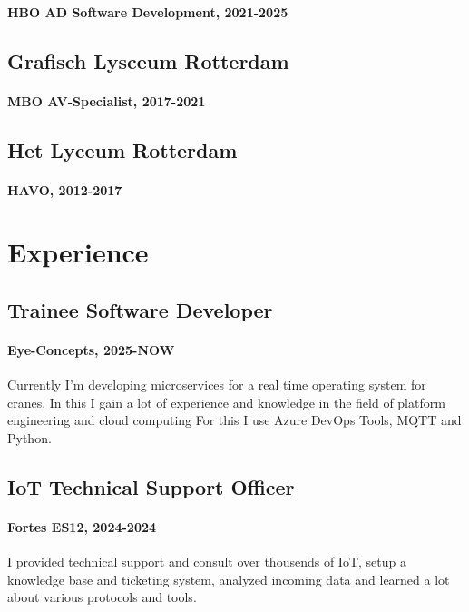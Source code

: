 \documentclass[11pt, twoside, a4paper, titlepage]{article}
\begin{document}
\paragraph{HBO AD Software Development, 2021-2025}

\subsection{Grafisch Lysceum Rotterdam}
\paragraph{MBO AV-Specialist, 2017-2021}

\subsection{Het Lyceum Rotterdam}
\paragraph{HAVO, 2012-2017}

\section{Experience}
\subsection{Trainee Software Developer}
\paragraph{Eye-Concepts, 2025-NOW}
Currently I'm developing microservices for a real time operating system for cranes. In this I gain a lot of experience and knowledge in the field of platform engineering and cloud computing For this I use Azure DevOps Tools, MQTT and Python.


\subsection{IoT Technical Support Officer}
\paragraph{Fortes ES12, 2024-2024}
I provided technical support and consult over thousends of IoT, setup a knowledge base and ticketing system, analyzed incoming data and learned a lot about various protocols and tools.
\end{document}
